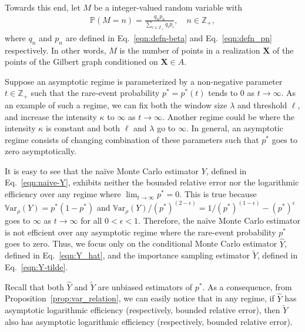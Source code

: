 \documentclass[pdflatex, sn-mathphys-ay]{sn-jnl}%
\newcommand{\intg}{\mathbb{Z}}
\renewcommand{\v}[1]{\boldsymbol{#1}}
\newcommand{\pp}{\mathbb{P}}
\newcommand{\mX}{\v{X}}
\newcommand{\wt}{\widetilde}
\newcommand{\wh}{\widehat}
\newcommand{\var}{\mathbb{V}\mathrm{ar}}
\theoremstyle{thmstyleone}%
\theoremstyle{thmstyletwo}%
\theoremstyle{thmstylethree}%
\begin{document}
Towards this end, let $M$ be a integer-valued random variable with
\begin{align}
\pp(M = n) = \frac{q_n p_n}{\sum_{i \in \intg_+} q_i p_i}, \quad n \in \intg_+, \label{eqn:defn_M}
\end{align}
where $q_n$ and $p_n$ are defined in Eq.~\eqref{eqn:defn-beta} and Eq.~\eqref{eqn:defn_pn} respectively. 
In other words, $M$ is the number of points in a realization $\mX$ of the points of the Gilbert graph conditioned on $\mX \in A$. 


Suppose an asymptotic regime is parameterized by a non-negative parameter $t \in \intg_+$ such that the rare-event probability $p^* = p^*(t)$ tends to $0$ as $t \to \infty$. 
As an example of such a regime, we can fix both the window size $\lambda$ and threshold $\ell$, and increase the intensity $\kappa$ to $\infty$ as $t \to \infty$. Another regime could be where the intensity $\kappa$ is constant and both $\ell$ and $\lambda$ go to $\infty$. In general, an asymptotic regime consists of changing combination of these parameters such that $p^*$ goes to zero asymptotically. 

It is easy to see that the na\"{i}ve Monte Carlo estimator $Y$, defined in Eq.~\eqref{eqn:naive-Y}, exhibits neither the bounded relative error nor the logarithmic efficiency over any regime where $\lim_{t \to \infty} p^* = 0$. This is true because $\var_\rho(Y) = p^*(1 - p^*)$ and 
\(
{\var_\rho(Y)}/{(p^*)^{(2- \epsilon)}} = {1}/{(p^*)^{(1 - \epsilon)}} - (p^*)^\epsilon 
\)
goes to $\infty$ as $t \to \infty$ for all $0 <\epsilon < 1$. Therefore, the na\"{i}ve Monte Carlo estimator is not efficient over any asymptotic regime where the rare-event probability $p^*$ goes to zero.
Thus, we focus only on the conditional Monte Carlo estimator $\wh Y$, defined in Eq.~\eqref{eqn:Y_hat}, and the importance sampling estimator $\wt Y$, defined in Eq.~\eqref{eqn:Y-tilde}. 

Recall that both $\wh Y$ and $\wt Y$ are unbiased estimators of $p^*$. As a consequence, from Proposition~\ref{prop:var_relation}, we can easily notice that in any regime, if $\wh Y$ has asymptotic logarithmic efficiency (respectively, bounded relative error), then $\wt Y$ also has asymptotic logarithmic efficiency (respectively, bounded relative error). 
\end{document}
